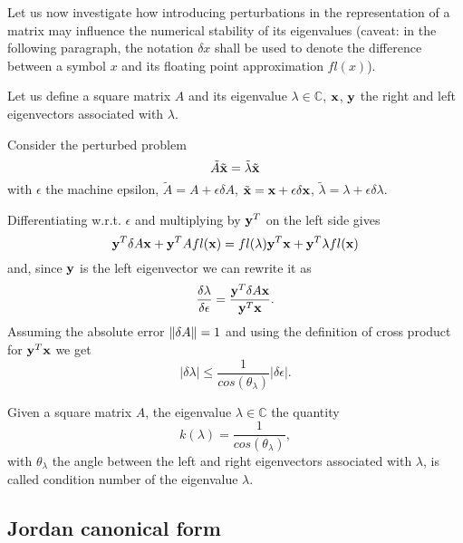 Let us now investigate how introducing perturbations in the representation of a matrix may influence the numerical stability of its
eigenvalues (caveat: in the following paragraph, the notation \(\delta x\) shall be used to denote the difference between a symbol
\(x\) and its floating point approximation \(fl(x)\)).

Let us define a square matrix \(A\) and its eigenvalue \(\lambda \in \mathbb{C}\), \(\vb{x}\), \(\vb{y}\) the right
and left eigenvectors associated with \(\lambda\).

Consider the perturbed problem
\[
    \tilde{A} \tilde{\vb{x}} = \tilde{\lambda} \tilde{\vb{x}}
\]
with \(\epsilon\) the machine epsilon, \(\tilde{A} = A + \epsilon\delta A\), \(\tilde{\vb{x}} = \vb{x} + \epsilon\delta \vb{x}\),
\(\tilde{\lambda} = \lambda + \epsilon\delta \lambda\).

Differentiating w.r.t. \(\epsilon\) and multiplying by \(\vb{y}^T\) on the left side gives
\[
    \vb{y}^T \delta A \vb{x} + \vb{y}^T A fl(\vb{x}) = fl(\lambda) \vb{y}^T \vb{x} + \vb{y}^T \lambda fl(\vb{x})
\]
and, since \(\vb{y}\) is the left eigenvector we can rewrite it as
\[
    \dfrac{\delta \lambda}{\delta \epsilon} = \dfrac{\vb{y}^T \delta A \vb{x}}{\vb{y}^T \vb{x}}.
\]
Assuming the absolute error \(\norm{\delta A} = 1\) and using the definition of cross product for \(\vb{y}^T \vb{x}\) we get
\[
    \vert \delta \lambda \vert \leq \dfrac{1}{cos(\theta_{\lambda})} \vert \delta \epsilon \vert.
\]

\begin{theorem}
    Given a square matrix \(A\), the eigenvalue \(\lambda \in \mathbb{C}\) the quantity
    \[k(\lambda) = \dfrac{1}{cos(\theta_{\lambda})},\]
    with \(\theta_{\lambda}\) the angle between the left and right eigenvectors associated with \(\lambda\), is called condition number
    of the eigenvalue \(\lambda\).
\end{theorem}
    
\subsection*{Jordan canonical form}